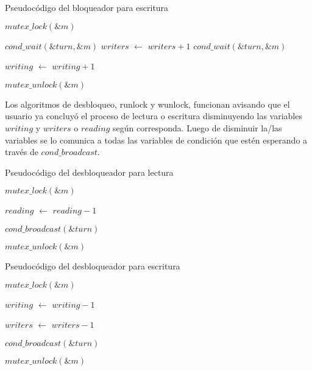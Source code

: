 \begin{algorithm}[H]
  \begin{algorithmic}[1]
  \caption{Pseudocódigo del bloqueador para escritura}
  \label{algo:3-1}
	\State $mutex\_lock(\&m)$

		\State $ cond\_wait(\&turn, \&m) $
	\EndWhile
	\State $writers$ $\leftarrow$ $writers + 1$
		\State $ cond\_wait(\&turn, \&m) $
	\EndWhile
	
	\State $writing$ $\leftarrow$ $writing + 1$

	\State $mutex\_unlock(\&m)$

	\EndProcedure
	\end{algorithmic}
\end{algorithm}

Los algoritmos de desbloqueo, runlock y wunlock, funcionan avisando que el usuario ya concluyó el proceso de lectura o escritura disminuyendo las variables $writing$ y $writers$ o $reading$ según corresponda. Luego de disminuir la/las variables se lo comunica a todas las variables de condición que estén esperando a través de $cond\_broadcast$.

\begin{algorithm}[H]
  \begin{algorithmic}[1]
  \caption{Pseudocódigo del desbloqueador para lectura}
  \label{algo:3-1}
	\State $mutex\_lock(\&m)$

	\State $reading$ $\leftarrow$ $reading - 1$
	
	\State $cond\_broadcast(\&turn)$

	\State $mutex\_unlock(\&m)$

	\EndProcedure
	\end{algorithmic}
\end{algorithm}

\begin{algorithm}[H]
  \begin{algorithmic}[1]
  \caption{Pseudocódigo del desbloqueador para escritura}
  \label{algo:3-1}
	\State $mutex\_lock(\&m)$

	\State $writing$ $\leftarrow$ $writing - 1$
	
	\State $writers$ $\leftarrow$ $writers - 1$
	
	\State $cond\_broadcast(\&turn)$

	\State $mutex\_unlock(\&m)$

	\EndProcedure
	\end{algorithmic}
\end{algorithm}


